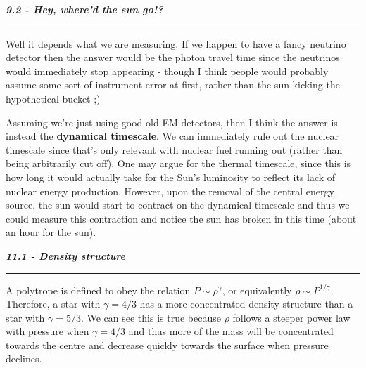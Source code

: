 \documentclass[12pt, letterpaper, twoside]{article}
\newcommand{\question}[1]{{\noindent \it #1}}
\newcommand{\answer}[1]{
    \par\noindent\rule{\textwidth}{0.4pt}#1\vspace{0.5cm}
}
\begin{document}
\question{\textbf{9.2 - Hey, where'd the sun go!?}}
\answer{
    Well it depends what we are measuring. If we happen to have a fancy neutrino detector then the answer would be the photon travel time since the neutrinos would immediately stop appearing - though I think people would probably assume some sort of instrument error at first, rather than the sun kicking the hypothetical bucket ;)

    Assuming we're just using good old EM detectors, then I think the answer is instead the \textbf{dynamical timescale}. We can immediately rule out the nuclear timescale since that's only relevant with nuclear fuel running out (rather than being arbitrarily cut off). One may argue for the thermal timescale, since this is how long it would actually take for the Sun's luminosity to reflect its lack of nuclear energy production. However, upon the removal of the central energy source, the sun would start to contract on the dynamical timescale and thus we could measure this contraction and notice the sun has broken in this time (about an hour for the sun).
}

\question{\textbf{11.1 - Density structure}}
\answer{
    A polytrope is defined to obey the relation $P \sim \rho^{\gamma}$, or equivalently $\rho \sim P^{1/\gamma}$. Therefore, a star with $\gamma =4/3$ has a more concentrated density structure than a star with $\gamma =5/3$. We can see this is true because $\rho$ follows a steeper power law with pressure when $\gamma = 4/3$ and thus more of the mass will be concentrated towards the centre and decrease quickly towards the surface when pressure declines.
}
\end{document}
